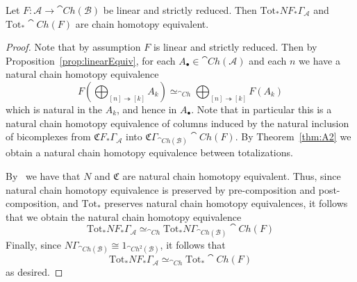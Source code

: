 \begin{lem}[label=lem:equivDef]
    Let $F:\mathcal{A}\to \cat{Ch}(\mathcal{B})$ be linear and strictly reduced. Then $\text{Tot}_*NF_*\Gamma_\mathcal{A}$ and $\text{Tot}_*\cat{Ch}(F)$ are  chain homotopy equivalent.
\end{lem}
\begin{proof}
    Note that by assumption $F$ is linear and strictly reduced. Then by Proposition~\ref{prop:linearEquiv}, for each $A_\bullet \in \cat{Ch}(\mathcal{A})$ and each $n$ we have a natural chain homotopy equivalence
    \begin{equation*}
        F\left(\bigoplus_{[n]\twoheadrightarrow[k]}A_k\right) \simeq_{\cat{Ch}} \bigoplus_{[n]\twoheadrightarrow[k]}F(A_k)
    \end{equation*}
    which is natural in the $A_k$, and hence in $A_{\bullet}$. Note that in particular this is a natural chain homotopy equivalence of columns induced by the natural inclusion of bicomplexes from $\mathfrak{C}F_*\Gamma_\mathcal{A}$ into $\mathfrak{C}\Gamma_{\cat{Ch}(\mathcal{B})}\cat{Ch}(F)$. By Theorem~\ref{thm:A2} we obtain a natural chain homotopy equivalence between totalizations.
    

    By~\cite[Thm 2.5]{goerss-jardine} we have that $N$ and $\mathfrak{C}$ are natural chain homotopy equivalent. Thus, since natural chain homotopy equivalence is preserved by pre-composition and post-composition, and $\text{Tot}_*$ preserves natural chain homotopy equivalences, it follows that we obtain the natural chain homotopy equivalence
    \begin{equation*}
        \text{Tot}_*NF_*\Gamma_\mathcal{A}\simeq_{\cat{Ch}} \text{Tot}_*N\Gamma_{\cat{Ch}(\mathcal{B})}\cat{Ch}(F)
    \end{equation*}
    Finally, since $N\Gamma_{\cat{Ch}(\mathcal{B})} \cong 1_{\cat{Ch}^2(\mathcal{B})}$, it follows that 
    \begin{equation*}
        \text{Tot}_*NF_*\Gamma_\mathcal{A}\simeq_{\cat{Ch}} \text{Tot}_*\cat{Ch}(F)
    \end{equation*}
    as desired.
\end{proof}


